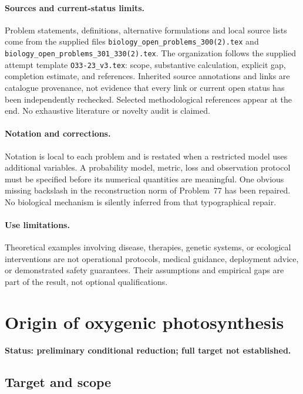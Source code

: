 \documentclass[11pt]{article}
\begin{document}
\paragraph{Sources and current-status limits.}
Problem statements, definitions, alternative formulations and local source lists
come from the supplied files
\texttt{biology\_open\_problems\_300(2).tex} and
\texttt{biology\_open\_problems\_301\_330(2).tex}.
The organization follows the supplied attempt template
\texttt{O33-23\_v3.tex}: scope, substantive calculation, explicit gap,
completion estimate, and references. Inherited source annotations and links are
catalogue provenance, not evidence that every link or current open status has
been independently rechecked. Selected methodological references appear at the
end. No exhaustive literature or novelty audit is claimed.

\paragraph{Notation and corrections.}
Notation is local to each problem and is restated when a restricted model uses
additional variables. A probability model, metric, loss and observation protocol
must be specified before its numerical quantities are meaningful. One obvious
missing backslash in the reconstruction norm of Problem~77 has been repaired.
No biological mechanism is silently inferred from that typographical repair.

\paragraph{Use limitations.}
Theoretical examples involving disease, therapies, genetic systems, or ecological
interventions are not operational protocols, medical guidance, deployment advice,
or demonstrated safety guarantees. Their assumptions and empirical gaps are part
of the result, not optional qualifications.


\section*{Origin of oxygenic photosynthesis}
\label{prob:326}
\noindent\textbf{Status: preliminary conditional reduction; full target not established.}
\subsection{Target and scope}
\end{document}

